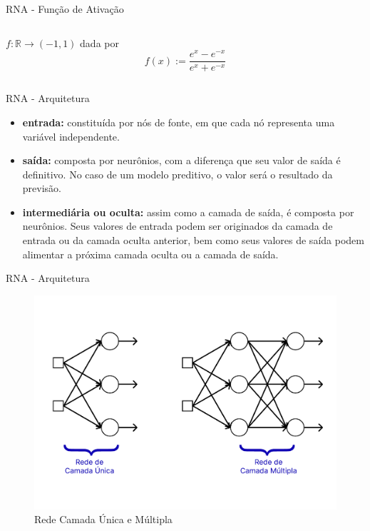 \documentclass{beamer}
\newcommand{\R}{\mathds{R}}
\begin{document}
\begin{frame}{RNA - Função de Ativação}
\begin{columns}[onlytextwidth,t]
\begin{column}{0.48\textwidth}
	            $f:\R \rightarrow (-1,1)$ dada por 
                \[f(x) := \frac{e^{x}-e^{-x}}{e^{x}+e^{-x}}\]
 
            \end{column}
        \end{columns}
    \end{frame}

    \begin{frame}{RNA - Arquitetura}
        \begin{itemize}
            \justifying
            \item \textbf{entrada:} constituída por nós de fonte, em que cada nó representa uma variável independente. 
            \item \textbf{saída:} composta por neurônios, com a diferença que seu valor de saída é definitivo. No caso de um modelo preditivo, o valor será o resultado da previsão.
            \item \textbf{intermediária ou oculta:} assim como a camada de saída, é composta por neurônios. Seus valores de entrada podem ser originados da camada de entrada ou da camada oculta anterior, bem como seus valores de saída podem alimentar a próxima camada oculta ou a camada de saída.
        \end{itemize}
    \end{frame}
    
    \begin{frame}{RNA - Arquitetura}
        \centering
        \begin{figure}
            \includegraphics[scale=0.25]{figuras/network_layers.pdf}
		    \caption{Rede Camada Única e Múltipla \citep[adaptado de][]{haykin2009}}
	    \end{figure}
    \end{frame}
\end{document}
